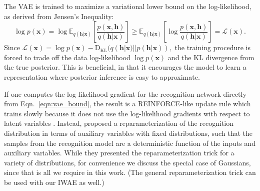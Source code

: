 \documentclass{article} %
\newcommand{\expect}{\mathbb{E}}
\newcommand{\kldiv}{\mathrm{D}_{\mathrm{KL}}}
\newcommand{\hid}{\mathbf{h}}
\newcommand{\params}{{\boldsymbol{\theta}}}
\newcommand{\obs}{\mathbf{x}}
\newcommand{\pmfGen}{p}
\newcommand{\pmfRec}{q}
\newcommand{\pmfData}{\pmfGen_{\rm data}}
\newcommand{\varBound}{\mathcal{L}}
\begin{document}
The VAE is trained to maximize a variational lower bound on the log-likelihood, as derived from Jensen's Inequality:
\begin{equation}
\log \pmfGen(\obs) = \log \expect_{\pmfRec(\hid|\obs)}\left[\frac{\pmfGen(\obs,\hid)}{\pmfRec(\hid|\obs)}\right]\geq \expect_{\pmfRec(\hid|\obs)}\left[\log\frac{\pmfGen(\obs,\hid)}{\pmfRec(\hid|\obs)}\right] = \varBound(\obs). \label{eqn:vae_bound}
\end{equation}
Since $\varBound(\obs) = \log \pmfGen(\obs) - \kldiv(\pmfRec(\hid|\obs)||\pmfGen(\hid|\obs)),$ the training procedure is forced to trade off the data log-likelihood $\log \pmfGen(\obs)$ and the KL divergence from the true posterior. This is beneficial, in that it encourages the model to learn a representation where posterior inference is easy to approximate.

If one computes the log-likelihood gradient for the recognition network directly from Eqn.~\ref{eqn:vae_bound}, the result is a REINFORCE-like update rule which trains slowly because it does not use the log-likelihood gradients with respect to latent variables \citep{helmholtz_machine,nvil}. Instead, \citet{vae} proposed a reparameterization of the recognition distribution in terms of auxiliary variables with fixed distributions, such that the samples from the recognition model are a deterministic function of the inputs and auxiliary variables. While they presented the reparameterization trick for a variety of distributions, for convenience we discuss the special case of Gaussians, since that is all we require in this work. (The general reparameterization trick can be used with our IWAE as well.)
\end{document}
